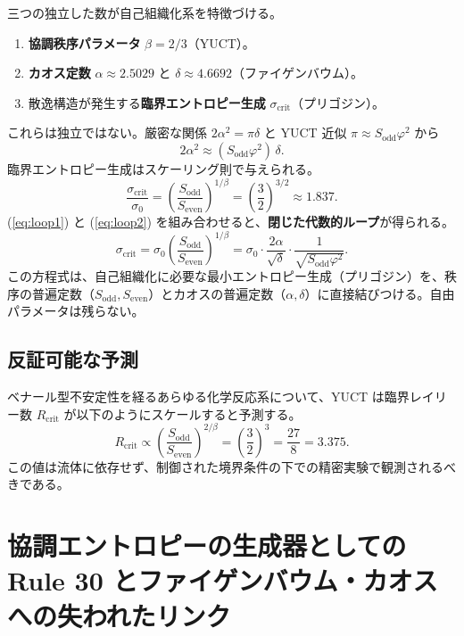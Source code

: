 \documentclass[11pt,a4paper]{article}
\begin{document}
	三つの独立した数が自己組織化系を特徴づける。
	\begin{enumerate}
		\item \textbf{協調秩序パラメータ} \(\beta = 2/3\)（YUCT）。
		\item \textbf{カオス定数} \(\alpha \approx 2.5029\) と \(\delta \approx 4.6692\)（ファイゲンバウム）。
		\item 散逸構造が発生する\textbf{臨界エントロピー生成} \(\sigma_{\mathrm{crit}}\)（プリゴジン）。
	\end{enumerate}
	これらは独立ではない。厳密な関係 \(2\alpha^2 = \pi\delta\) と YUCT 近似 \(\pi \approx S_{\mathrm{odd}}\varphi^2\) から
	\begin{equation}
		2\alpha^2 \approx (S_{\mathrm{odd}}\varphi^2)\,\delta .
		\label{eq:loop1}
	\end{equation}
	臨界エントロピー生成はスケーリング則で与えられる。
	\begin{equation}
		\frac{\sigma_{\mathrm{crit}}}{\sigma_0} = \left( \frac{S_{\mathrm{odd}}}{S_{\mathrm{even}}} \right)^{1/\beta}
		= \left( \frac{3}{2} \right)^{3/2} \approx 1.837 .
		\label{eq:loop2}
	\end{equation}
	(\ref{eq:loop1}) と (\ref{eq:loop2}) を組み合わせると、\textbf{閉じた代数的ループ}が得られる。
	\[
	\boxed{
		\sigma_{\mathrm{crit}} = \sigma_0 \left( \frac{S_{\mathrm{odd}}}{S_{\mathrm{even}}} \right)^{1/\beta}
		= \sigma_0 \cdot \frac{2\alpha}{\sqrt{\delta}} \cdot \frac{1}{\sqrt{S_{\mathrm{odd}}\varphi^2}} .
	}
	\]
	この方程式は、自己組織化に必要な最小エントロピー生成（プリゴジン）を、秩序の普遍定数（\(S_{\mathrm{odd}},S_{\mathrm{even}}\)）とカオスの普遍定数（\(\alpha,\delta\)）に直接結びつける。自由パラメータは残らない。
	
	\subsection{反証可能な予測}
	
	ベナール型不安定性を経るあらゆる化学反応系について、YUCT は臨界レイリー数 \(R_{\mathrm{crit}}\) が以下のようにスケールすると予測する。
	\[
	R_{\mathrm{crit}} \propto \left( \frac{S_{\mathrm{odd}}}{S_{\mathrm{even}}} \right)^{2/\beta}
	= \left( \frac{3}{2} \right)^3 = \frac{27}{8} = 3.375 .
	\]
	この値は流体に依存せず、制御された境界条件の下での精密実験で観測されるべきである。
	
	\section{協調エントロピーの生成器としての Rule 30 とファイゲンバウム・カオスへの失われたリンク}
	\label{sec:rule30}
	
\end{document}
